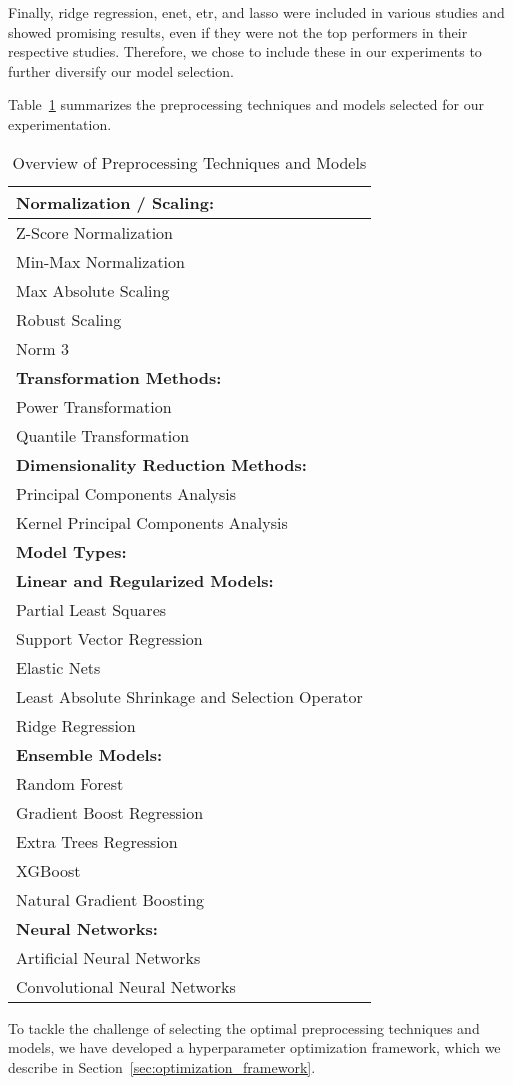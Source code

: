Finally, ridge regression, \gls{enet}, \gls{etr}, and \gls{lasso} were included in various studies and showed promising results, even if they were not the top performers in their respective studies.
Therefore, we chose to include these in our experiments to further diversify our model selection.

Table~\ref{tab:preprocessing-models} summarizes the preprocessing techniques and models selected for our experimentation.

\begin{table}
\centering
\begin{tabularx}{\columnwidth}{>{\raggedright\arraybackslash}X}
\toprule
\textbf{Normalization / Scaling:} \\
\midrule
Z-Score Normalization \\
Min-Max Normalization \\
Max Absolute Scaling \\
Robust Scaling \\
Norm 3 \\
\midrule
\textbf{Transformation Methods:} \\
\midrule
Power Transformation \\
Quantile Transformation \\
\midrule
\textbf{Dimensionality Reduction Methods:} \\
\midrule
Principal Components Analysis \\
Kernel Principal Components Analysis \\
\midrule
\textbf{Model Types:} \\
\midrule
\textbf{Linear and Regularized Models:} \\
\quad Partial Least Squares \\
\quad Support Vector Regression \\
\quad Elastic Nets \\
\quad Least Absolute Shrinkage and Selection Operator \\
\quad Ridge Regression \\
\textbf{Ensemble Models:} \\
\quad Random Forest \\
\quad Gradient Boost Regression \\
\quad Extra Trees Regression \\
\quad XGBoost \\
\quad Natural Gradient Boosting \\
\textbf{Neural Networks:} \\
\quad Artificial Neural Networks \\
\quad Convolutional Neural Networks \\\bottomrule
\end{tabularx}
\caption{Overview of Preprocessing Techniques and Models}
\label{tab:preprocessing-models}
\end{table}

To tackle the challenge of selecting the optimal preprocessing techniques and models, we have developed a hyperparameter optimization framework, which we describe in Section~\ref{sec:optimization_framework}.